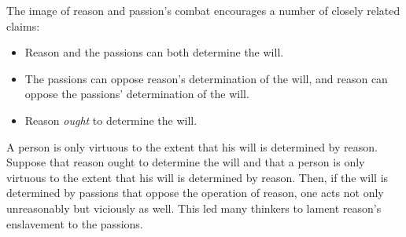 The image of reason and passion's combat encourages a number of closely related claims:

\begin{itemize}
    \item Reason and the passions can both determine the will.
    \item The passions can oppose reason's determination of the will, and reason can oppose the passions' determination of the will.
    \item Reason \emph{ought} to determine the will.
\end{itemize}

A person is only virtuous to the extent that his will is determined by reason.
Suppose that reason ought to determine the will and that a person is only virtuous to the extent that his will is determined by reason. Then, if the will is determined by passions that oppose the operation of reason, one acts not only unreasonably but viciously as well. This led many thinkers to lament reason's enslavement to the passions. \change

% 



